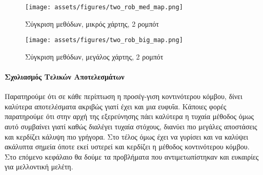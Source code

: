 \begin{figure}[!h]
	\centering
	\texttt{[image: assets/figures/two\_rob\_med\_map.png]}
	\caption{Σύγκριση μεθόδων, μικρός χάρτης, 2 ρομπότ}
\end{figure}

\newpage

\begin{figure}[!h]
	\centering
	\texttt{[image: assets/figures/two\_rob\_big\_map.png]}
	\caption{Σύγκριση μεθόδων, μεγάλος χάρτης, 2 ρομπότ}
\end{figure}

\paragraph{Σχολιασμός Τελικών Αποτελεσμάτων}

Παρατηρούμε ότι σε κάθε περίπτωση η προσέγ-γιση κοντινότερου κόμβου, δίνει καλύτερα αποτελέσματα ακριβώς γιατί έχει και μια ευφυΐα. Κάποιες φορές παρατηρούμε ότι στην αρχή της εξερεύνησης πάει καλύτερα η τυχαία μέθοδος όμως αυτό συμβαίνει γιατί καθώς διαλέγει τυχαία στόχους, διανύει πιο μεγάλες αποστάσεις και κερδίζει κάλυψη πιο γρήγορα. Στο τέλος όμως έχει να γυρίσει και να καλύψει ακάλυπτα σημεία όποτε εκεί υστερεί και κερδίζει η μέθοδος κοντινότερου κόμβου.
Στο επόμενο κεφάλαιο θα δούμε τα προβλήματα που αντιμετωπίστηκαν και ευκαιρίες για μελλοντική μελέτη.
